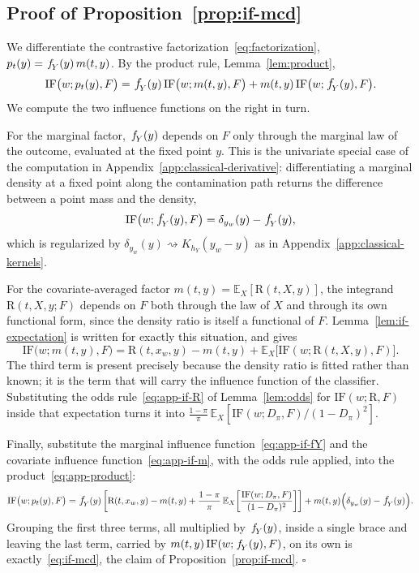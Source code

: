 \documentclass[11pt]{article}
\theoremstyle{plain}
\theoremstyle{definition}
\theoremstyle{remark}
\newcommand{\pE}{\ensuremath{\mathbb{E}}}
\newcommand{\pf}[1]{\ensuremath{\,\mathlarger{\textit{f}}_{#1}}}
\newcommand{\ratio}{\ensuremath{\pi}}
\newcommand{\contrast}{D_{\ratio}}
\newcommand{\DensityRatio}{\text{R}}
\newcommand{\IF}{\mathrm{IF}}
\begin{document}
\subsection{Proof of Proposition~\ref{prop:if-mcd}}
\label{app:mcd-derivation}

We differentiate the contrastive factorization~\eqref{eq:factorization},
$p_t(y) = \pf{Y}(y)\,m(t,y)$. By the product rule, Lemma~\ref{lem:product},
\begin{equation}
\IF\big(w;p_t(y),F\big)
= \pf{Y}(y)\,\IF\big(w;m(t,y),F\big)
+ m(t,y)\,\IF\big(w;\pf{Y}(y),F\big).
\label{eq:app-product}
\end{equation}
We compute the two influence functions on the right in turn.

For the marginal factor, $\pf{Y}(y)$ depends on $F$ only through the marginal law of the
outcome, evaluated at the fixed point $y$. This is the univariate special case of the
computation in Appendix~\ref{app:classical-derivative}: differentiating a marginal density at a
fixed point along the contamination path returns the difference between a point mass and the
density,
\begin{equation}
\IF\big(w;\pf{Y}(y),F\big) = \delta_{y_w}(y) - \pf{Y}(y),
\label{eq:app-if-fY}
\end{equation}
which is regularized by $\delta_{y_w}(y) \rightsquigarrow K_{h_Y}(y_w - y)$ as in
Appendix~\ref{app:classical-kernels}.

For the covariate-averaged factor $m(t,y) = \pE_X[\DensityRatio(t,X,y)]$, the integrand
$\DensityRatio(t,X,y;F)$ depends on $F$ both through the law of $X$ and through its own
functional form, since the density ratio is itself a functional of $F$. Lemma~\ref{lem:if-expectation}
is written for exactly this situation, and gives
\begin{equation}
\IF\big(w;m(t,y),F\big)
= \DensityRatio(t,x_w,y) - m(t,y)
+ \pE_X\big[ \IF(w;\DensityRatio(t,X,y),F) \big].
\label{eq:app-if-m}
\end{equation}
The third term is present precisely because the density ratio is fitted rather than known; it
is the term that will carry the influence function of the classifier. Substituting the odds
rule~\eqref{eq:app-if-R} of Lemma~\ref{lem:odds} for $\IF(w;\DensityRatio,F)$ inside that
expectation turns it into
$\frac{1-\ratio}{\ratio}\,\pE_X[\IF(w;\contrast,F)/(1-\contrast)^2]$.

Finally, substitute the marginal influence function~\eqref{eq:app-if-fY} and the covariate
influence function~\eqref{eq:app-if-m}, with the odds rule applied, into the
product~\eqref{eq:app-product}:
\[
\IF\big(w;p_t(y),F\big)
= \pf{Y}(y)\left[ \DensityRatio(t,x_w,y) - m(t,y)
+ \frac{1-\ratio}{\ratio}\,\pE_X\!\left[\frac{\IF(w;\contrast,F)}{(1-\contrast)^2}\right] \right]
+ m(t,y)\Big(\delta_{y_w}(y) - \pf{Y}(y)\Big).
\]
Grouping the first three terms, all multiplied by $\pf{Y}(y)$, inside a single brace and leaving
the last term, carried by $m(t,y)\,\IF(w;\pf{Y}(y),F)$, on its own is exactly~\eqref{eq:if-mcd},
the claim of Proposition~\ref{prop:if-mcd}. \hfill$\square$
\end{document}

